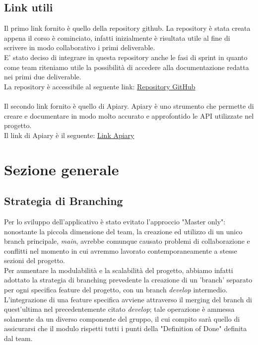 \documentclass{article}
\begin{document}
\subsection{Link utili}
Il primo link fornito è quello della repository github. La repository è stata creata appena il corso è cominciato, infatti inizialmente è risultata utile al fine di scrivere in modo collaborativo i primi deliverable.\\
E' stato deciso di integrare in questa repository anche le fasi di sprint in quanto come team riteniamo utile la possibilità di accedere alla documentazione redatta nei primi due deliverable.\\
La repository è accessibile al seguente link: \href{https://github.com/ELI20ZIVI/BeeLive/}{Repository GitHub}\\ \\
Il secondo link fornito è quello di Apiary. Apiary è uno strumento che permette di creare e documentare in modo molto accurato e approfontido le API utilizzate nel progetto.\\
Il link di Apiary è il seguente: \href{https://beelive.docs.apiary.io/#}{Link Apiary}\\

\clearpage

\section{Sezione generale}

\subsection{Strategia di Branching}

Per lo sviluppo dell'applicativo è stato evitato l'approccio "Master only": nonostante la piccola dimensione del team, la creazione ed utilizzo di un unico branch principale, \textit{main}, avrebbe comunque causato problemi di collaborazione e conflitti nel momento in cui avremmo lavorato contemporaneamente a stesse sezioni del progetto.\\

\noindent
Per aumentare la modulabilità e la scalabilità del progetto, abbiamo infatti adottato la strategia di branching prevedente la creazione di un 'branch' separato per ogni specifica feature del progetto, con un branch \textit{develop} intermedio.\\

\noindent
L'integrazione di una feature specifica avviene attraverso il merging del branch di quest'ultima nel precedentemente citato \textit{develop}; tale operazione è ammessa solamente da un diverso componente del gruppo, il cui compito sarà quello di assicurarsi che il modulo rispetti tutti i punti della "Definition of Done" definita dal team. \\
\end{document}
